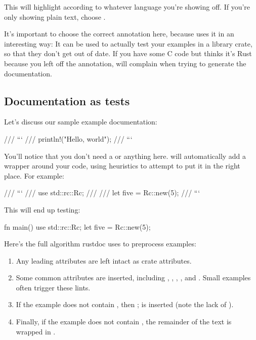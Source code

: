This will highlight according to whatever language you're showing off. If you're only showing plain text, choose .

\blank

It's important to choose the correct annotation here, because  uses it in an interesting way: It can be used to 
actually test your examples in a library crate, so that they don't get out of date. If you have some C code but  
thinks it's Rust because you left off the annotation,  will complain when trying to generate the documentation.

\subsection*{Documentation as tests}

Let's discuss our sample example documentation:

\begin{rustc}
/// ```
/// println!("Hello, world");
/// ```
\end{rustc}

You'll notice that you don't need a  or anything here.  will automatically add a  
wrapper around your code, using heuristics to attempt to put it in the right place. For example:

\begin{rustc}
/// ```
/// use std::rc::Rc;
///
/// let five = Rc::new(5);
/// ```
\end{rustc}

This will end up testing:

\begin{rustc}
fn main() {
    use std::rc::Rc;
    let five = Rc::new(5);
}
\end{rustc}

Here's the full algorithm rustdoc uses to preprocess examples:

\begin{enumerate}
  \item{Any leading \code{\#![foo]} attributes are left intact as crate attributes.}
  \item{Some common  attributes are inserted, including , , , 
      , and . Small examples often trigger these lints.}
  \item{If the example does not contain , then ; is inserted (note the lack of 
      ).}
  \item{Finally, if the example does not contain , the remainder of the text is wrapped in .}
\end{enumerate}

